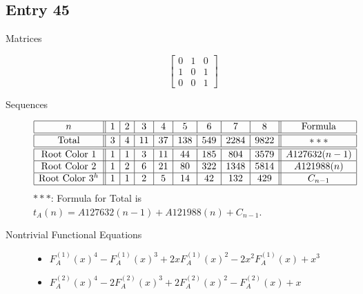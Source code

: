 \documentclass[12pt]{amsart}
\newcommand{\gff}[2]{F_{#2}^{(#1)}(x)}
\newcommand{\gfa}[1]{\gff{#1}{A}}
\begin{document}
\subsection*{Entry 45}
\begin{description}
    \item[Matrices]
    
    \[\begin{bmatrix}
0 & 1 & 0 \\
1 & 0 & 1 \\
0 & 0 & 1
\end{bmatrix}\]
    \item[Sequences]\hspace*{\fill}\vspace{-0.5cm}
    
    \begin{center}  
        \[
        \begin{array}{|c||c|c|c|c|c|c|c|c||c|}\hline
           n  & 1 & 2 & 3 & 4 & 5 & 6 & 7 & 8  & \text{Formula}\\\hline\hline
           \text{Total}  & 3 & 4 & 11 & 37 & 138 & 549 & 2284 & 9822 & 
           ***\\\hline\hline
           \text{Root Color }1 & 1 & 1 & 3 & 11 & 44 & 185 & 804 & 3579 & A127632(n-1)\\\hline
           \text{Root Color }2 & 1 & 2 & 6 & 21 & 80 & 322 & 1348 & 5814 & A121988(n)\\\hline
           \text{Root Color }3^{h} & 1 & 1 & 2 & 5 & 14 & 42 & 132 & 429 & C_{n-1}\\\hline
        \end{array}
        \]
        $***$: Formula for Total is $t_A(n)=A127632(n - 1) + A121988(n) + C_{n-1}$.
    \end{center}
    
    \item[Nontrivial Functional Equations]\hspace*{\fill}

    \begin{itemize}
\item $\gfa{1}^4-\gfa{1}^3+2x\gfa{1}^2-2x^2\gfa{1}+x^3$

\item $\gfa{2}^4-2\gfa{2}^3+2\gfa{2}^2-\gfa{2}+x$


\end{itemize}
\end{description}
\end{document}
